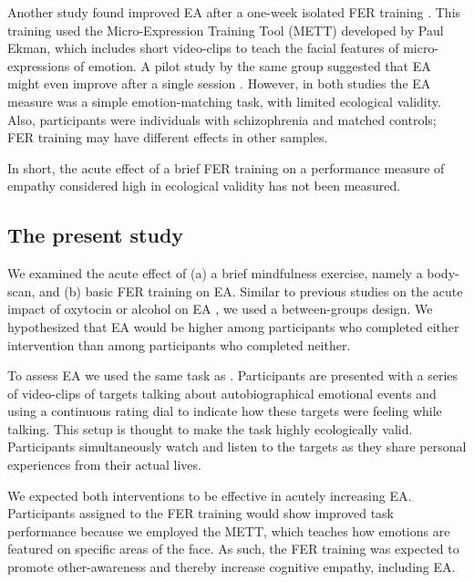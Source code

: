 \documentclass[authordate, empirical]{jote-new-article}
\begin{document}
	Another study found improved EA after a one-week isolated FER training \parencites{Russell2008}. This training used the Micro-Expression Training Tool (METT) developed by Paul Ekman, which includes short video-clips to teach the facial features of micro-expressions of emotion. A pilot study by the same group suggested that EA might even improve after a single session \parencites{Russell2006}. However, in both studies the EA measure was a simple emotion-matching task, with limited ecological validity. Also, participants were individuals with schizophrenia and matched controls; FER training may have different effects in other samples.



	In short, the acute effect of a brief FER training on a performance measure of empathy considered high in ecological validity has not been measured.



	\subsection{The present study}



	We examined the acute effect of (a) a brief mindfulness exercise, namely a body-scan, and (b) basic FER training on EA. Similar to previous studies on the acute impact of oxytocin or alcohol on EA \parencites{Bartz2010}{Thiel2018}, we used a between-groups design. We hypothesized that EA would be higher among participants who completed either intervention than among participants who completed neither.



	To assess EA we used the same task as \textcite{Thiel2018}. Participants are presented with a series of video-clips of targets talking about autobiographical emotional events and using a continuous rating dial to indicate how these targets were feeling while talking. This setup is thought to make the task highly ecologically valid. Participants simultaneously watch and listen to the targets as they share personal experiences from their actual lives.



	We expected both interventions to be effective in acutely increasing EA. Participants assigned to the FER training would show improved task performance because we employed the METT, which teaches how emotions are featured on specific areas of the face. As such, the FER training was expected to promote other-awareness and thereby increase cognitive empathy, including EA.
\end{document}
